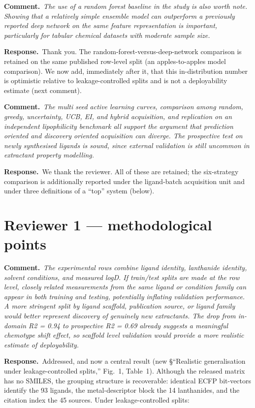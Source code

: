\documentclass[11pt]{article}
\newcommand{\rev}[1]{\begingroup\itshape\color{gray}#1\endgroup}
\newcommand{\resp}{\par\noindent\textbf{Response.}\ }
\newcommand{\cmt}[1]{\par\vspace{4pt}\noindent\textbf{Comment.}\ \rev{#1}\par\vspace{2pt}}
\begin{document}
\cmt{The use of a random forest baseline in the study is also worth note. Showing that a
relatively simple ensemble model can outperform a previously reported deep network on
the same feature representation is important, particularly for tabular chemical datasets
with moderate sample size.}
\resp Thank you. The random-forest-versus-deep-network comparison is retained on the
same published row-level split (an apples-to-apples model comparison). We now add,
immediately after it, that this in-distribution number is optimistic relative to
leakage-controlled splits and is not a deployability estimate (next comment).

\cmt{The multi seed active learning curves, comparison among random, greedy,
uncertainty, UCB, EI, and hybrid acquisition, and replication on an independent
lipophilicity benchmark all support the argument that prediction oriented and discovery
oriented acquisition can diverge. The prospective test on newly synthesised ligands is
sound, since external validation is still uncommon in extractant property modelling.}
\resp We thank the reviewer. All of these are retained; the six-strategy comparison is
additionally reported under the ligand-batch acquisition unit and under three
definitions of a ``top'' system (below).

\section*{Reviewer 1 --- methodological points}

\cmt{The experimental rows combine ligand identity, lanthanide identity, solvent
conditions, and measured logD. If train/test splits are made at the row level, closely
related measurements from the same ligand or condition family can appear in both
training and testing, potentially inflating validation performance. A more stringent
split by ligand scaffold, publication source, or ligand family would better represent
discovery of genuinely new extractants. The drop from in-domain R2 = 0.94 to
prospective R2 = 0.69 already suggests a meaningful chemotype shift effect, so scaffold
level validation would provide a more realistic estimate of deployability.}
\resp Addressed, and now a central result (new \S``Realistic generalisation under
leakage-controlled splits,'' Fig.~1, Table~1). Although the released matrix has no
SMILES, the grouping structure is recoverable: identical ECFP bit-vectors identify the
93 ligands, the metal-descriptor block the 14 lanthanides, and the citation index the
45 sources. Under leakage-controlled splits:
\end{document}
